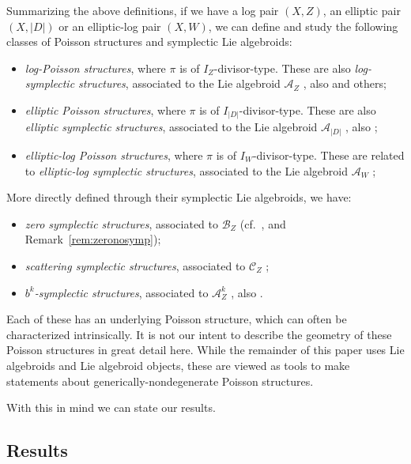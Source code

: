 \documentclass[10pt,a4paper]{amsart}
\numberwithin{equation}{section}
\begin{document}
Summarizing the above definitions, if we have a log pair $(X,Z)$, an elliptic pair $(X,|D|)$ or an elliptic-log pair $(X,W)$, we can define and study the following classes of Poisson structures and symplectic Lie algebroids:
\begin{itemize}\itemsep=0pt
\item \emph{log-Poisson structures}, where $\pi$ is of $I_Z$-divisor-type. These are also \emph{log-symplectic structures}, associated to the Lie algebroid $\mathcal{A}_Z$ \cite{GuilleminMirandaPires14, MarcutOsornoTorres14two}, also \cite{Cavalcanti17,GualtieriLi14, MarcutOsornoTorres14} and others;
\item \emph{elliptic Poisson structures}, where $\pi$ is of $I_{|D|}$-divisor-type. These are also \emph{elliptic symplectic structures}, associated to the Lie algebroid $\mathcal{A}_{|D|}$ \cite{CavalcantiGualtieri18}, also \cite{CavalcantiKlaasse18};
\item \emph{elliptic-log Poisson structures}, where $\pi$ is of $I_{W}$-divisor-type. These are related to \emph{elliptic-log symplectic structures}, associated to the Lie algebroid $\mathcal{A}_W$ \cite{Klaasse18};
\end{itemize}
More directly defined through their symplectic Lie algebroids, we have:
\begin{itemize}\itemsep=0pt
\item \emph{zero symplectic structures}, associated to $\mathcal{B}_Z$ (cf.\ \cite{Lanius16}, and Remark~\ref{rem:zeronosymp});
\item \emph{scattering symplectic structures}, associated to $\mathcal{C}_Z$ \cite{Lanius16};
\item \emph{$b^k$-symplectic structures}, associated to $\mathcal{A}_Z^k$ \cite{Scott16}, also \cite{GuilleminMirandaWeitsman17}.
\end{itemize}
Each of these has an underlying Poisson structure, which can often be characterized intrinsically. It is not our intent to describe the geometry of these Poisson structures in great detail here. While the remainder of this paper uses Lie algebroids and Lie algebroid objects, these are viewed as tools to make statements about generically-nondegenerate Poisson structures.

With this in mind we can state our results.

\subsection{Results}
\end{document}
